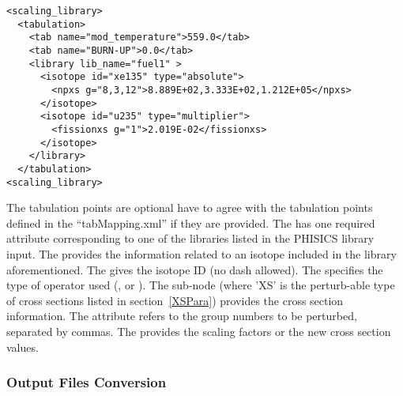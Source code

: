\begin{enumerate}
\begin{lstlisting}[style=XML]
<scaling_library>
  <tabulation>
    <tab name="mod_temperature">559.0</tab>
    <tab name="BURN-UP">0.0</tab>
    <library lib_name="fuel1" >
      <isotope id="xe135" type="absolute">
        <npxs g="8,3,12">8.889E+02,3.333E+02,1.212E+05</npxs>
      </isotope>
      <isotope id="u235" type="multiplier">
        <fissionxs g="1">2.019E-02</fissionxs>
      </isotope>
    </library>
  </tabulation>
<scaling_library>
\end{lstlisting}
The tabulation points  are optional have to agree with the tabulation points defined in the
 ``tabMapping.xml'' if they are provided.
The  has one required attribute  corresponding to one of the libraries
listed in the PHISICS library input.
The  provides the information related to an isotope included in the library aforementioned.
The  gives the isotope ID (no dash allowed).
The  specifies the type of operator used (,  or
 ).
The sub-node  (where 'XS' is the perturb-able type of cross sections listed in section~\ref{XSPara})
 provides the cross section information.
The  attribute refers to the group numbers to be perturbed, separated by commas.
The  provides the scaling factors or the new cross section values.
\end{enumerate}
%
\subsubsection{Output Files Conversion}
\label{subsubsection:PhisicsOutFileConv}


